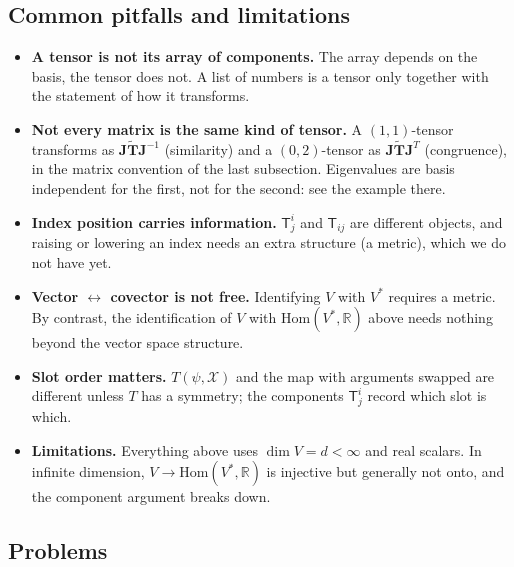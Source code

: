 \documentclass[11pt]{article}
\newcommand{\dual}{V^{*}}
\begin{document}
\subsection*{Common pitfalls and limitations}

\begin{itemize}
  \item \textbf{A tensor is not its array of components.} The array depends on the basis, the tensor does not. A list of numbers is a tensor only together with the statement of how it transforms.
  \item \textbf{Not every matrix is the same kind of tensor.} A $(1,1)$-tensor transforms as $\mathbf J\tilde{\mathbf T}\mathbf J^{-1}$ (similarity) and a $(0,2)$-tensor as $\mathbf J\tilde{\mathbf T}\mathbf J^{T}$ (congruence), in the matrix convention of the last subsection. Eigenvalues are basis independent for the first, not for the second: see the example there.
  \item \textbf{Index position carries information.} $\mathsf T^i_j$ and $\mathsf T_{ij}$ are different objects, and raising or lowering an index needs an extra structure (a metric), which we do not have yet.
  \item \textbf{Vector $\leftrightarrow$ covector is not free.} Identifying $V$ with $\dual$ requires a metric. By contrast, the identification of $V$ with $\mathrm{Hom}(\dual,\mathbb R)$ above needs nothing beyond the vector space structure.
  \item \textbf{Slot order matters.} $T(\psi,\mathcal X)$ and the map with arguments swapped are different unless $T$ has a symmetry; the components $\mathsf T^i_j$ record which slot is which.
  \item \textbf{Limitations.} Everything above uses $\dim V=d<\infty$ and real scalars. In infinite dimension, $V\to\mathrm{Hom}(\dual,\mathbb R)$ is injective but generally not onto, and the component argument breaks down.
\end{itemize}

\subsection*{Problems}
\end{document}
